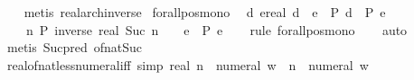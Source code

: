 \begin{isabellebody}
%
\isadelimproof
\ \ %
\endisadelimproof
%
\isatagproof
{}\isamarkupfalse%
\ {\isacharparenleft}{\kern0pt}metis\ real{\isacharunderscore}{\kern0pt}arch{\isacharunderscore}{\kern0pt}inverse{\isacharparenright}{\kern0pt}%
\endisatagproof
{\isafoldproof}%
%
\isadelimproof
\isanewline
%
\endisadelimproof
\isanewline
{}\isamarkupfalse%
\ forall{\isacharunderscore}{\kern0pt}pos{\isacharunderscore}{\kern0pt}mono{\isacharunderscore}{\kern0pt}{}{\isacharcolon}{\kern0pt}\isanewline
\ \ {\isachardoublequoteopen}{\isacharparenleft}{\kern0pt}{\isasymAnd}d\ e{\isacharcolon}{\kern0pt}{\isacharcolon}{\kern0pt}real{\isachardot}{\kern0pt}\ d\ {\isacharless}{\kern0pt}\ e\ {\isasymLongrightarrow}\ P\ d\ {\isasymLongrightarrow}\ P\ e{\isacharparenright}{\kern0pt}\ {\isasymLongrightarrow}\isanewline
\ \ \ \ {\isacharparenleft}{\kern0pt}{\isasymAnd}n{\isachardot}{\kern0pt}\ P\ {\isacharparenleft}{\kern0pt}inverse\ {\isacharparenleft}{\kern0pt}real\ {\isacharparenleft}{\kern0pt}Suc\ n{\isacharparenright}{\kern0pt}{\isacharparenright}{\kern0pt}{\isacharparenright}{\kern0pt}{\isacharparenright}{\kern0pt}\ {\isasymLongrightarrow}\ {}\ {\isacharless}{\kern0pt}\ e\ {\isasymLongrightarrow}\ P\ e{\isachardoublequoteclose}\isanewline
%
\isadelimproof
\ \ %
\endisadelimproof
%
\isatagproof
{}\isamarkupfalse%
\ {\isacharparenleft}{\kern0pt}rule\ forall{\isacharunderscore}{\kern0pt}pos{\isacharunderscore}{\kern0pt}mono{\isacharparenright}{\kern0pt}\isanewline
\ \ \isamarkupfalse%
\ auto\isanewline
\ \ \isamarkupfalse%
\ {\isacharparenleft}{\kern0pt}metis\ Suc{\isacharunderscore}{\kern0pt}pred\ of{\isacharunderscore}{\kern0pt}nat{\isacharunderscore}{\kern0pt}Suc{\isacharparenright}{\kern0pt}\isanewline
\ \ \isamarkupfalse%
%
\endisatagproof
{\isafoldproof}%
%
\isadelimproof
%
\endisadelimproof
%
\isadelimdocument
%
\endisadelimdocument
%
\isatagdocument
%
\isamarkuptrue%
%
\endisatagdocument
{\isafolddocument}%
%
\isadelimdocument
%
\endisadelimdocument
{}\isamarkupfalse%
\ real{\isacharunderscore}{\kern0pt}of{\isacharunderscore}{\kern0pt}nat{\isacharunderscore}{\kern0pt}less{\isacharunderscore}{\kern0pt}numeral{\isacharunderscore}{\kern0pt}iff\ {\isacharbrackleft}{\kern0pt}simp{\isacharbrackright}{\kern0pt}{\isacharcolon}{\kern0pt}\ {\isachardoublequoteopen}real\ n\ {\isacharless}{\kern0pt}\ numeral\ w\ {\isasymlongleftrightarrow}\ n\ {\isacharless}{\kern0pt}\ numeral\ w{\isachardoublequoteclose}\isanewline

\end{isabellebody}
